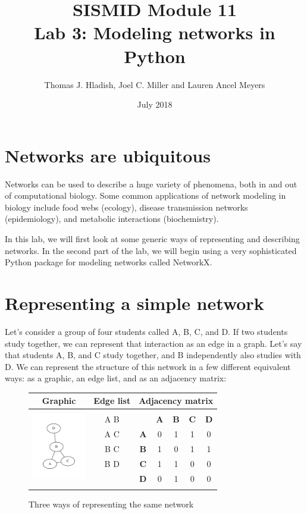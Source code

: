 \documentclass{article}
\begin{document}
\title{SISMID Module 11\\Lab 3: Modeling networks in Python}
\author{Thomas J. Hladish, Joel C. Miller and Lauren Ancel Meyers}
\date{July 2018}
\maketitle


\section*{Networks are ubiquitous}
Networks can be used to describe a huge variety of phenomena, both in and out of computational biology.  
Some common applications of network modeling in biology include food webs (ecology), disease transmission networks (epidemiology), 
and metabolic interactions (biochemistry).

In this lab, we will first look at some generic ways of representing and describing networks.  In the second part of the lab, we will
 begin using a very sophisticated Python package for modeling networks called NetworkX.

\section*{Representing a simple network}
Let's consider a group of four students called A, B, C, and D.  If two students study together, we can represent that interaction as an
 edge in a graph.  Let's say that students A, B, and C study together, and B independently also studies with D.  We can represent the 
structure of this network in a few different equivalent ways: as a graphic, an edge list, and as an adjacency matrix:

\UndefineShortVerb{\|}
\begin{figure}[h]
\begin{center}
\begin{tabular}{|c|c|c c c c c|}
\hline
\textbf{Graphic}	&\textbf{Edge list}	&\multicolumn{5}{|c|}{\textbf{Adjacency matrix}}	\\ \hline

\multirow{6}{*}{\includegraphics[trim = .4in .4in .4in .4in, clip, height=1.15in]{7_sampleABC.pdf}} &&&&&& \\
& A B & & \textbf{A} & \textbf{B} & \textbf{C} & \textbf{D} \\
& A C & \textbf{A} & 0 & 1 & 1 & 0\\
& B C & \textbf{B} & 1 & 0 & 1 & 1\\
& B D & \textbf{C} & 1 & 1 & 0 & 0\\
& & \textbf{D} & 0 & 1 & 0 & 0\\
&&&&&&\\
\hline
\end{tabular}
\caption{Three ways of representing the same network}
\end{center}
\end{figure}
\end{document}
